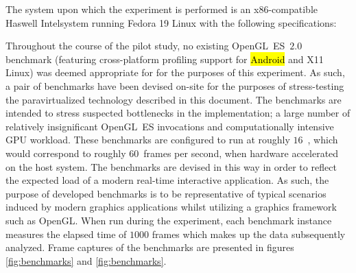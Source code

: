 The system upon which the experiment is performed is an x86-compatible Haswell Intel\circledR system running Fedora 19 Linux with the following specifications:


Throughout the course of the pilot study, no existing OpenGL~ES~$2.0$ benchmark (featuring cross-platform profiling support for \hl{Android} and X11 Linux) was deemed appropriate for for the purposes of this experiment.
As such, a pair of benchmarks have been devised on-site for the purposes of stress-testing the paravirtualized technology described in this document.
The benchmarks are intended to stress suspected bottlenecks in the implementation; a large number of relatively insignificant OpenGL~ES invocations and computationally intensive GPU workload.
These benchmarks are configured to run at roughly $16$~\milli\second , which would correspond to roughly $60$~frames per second, when hardware accelerated on the host system.
The benchmarks are devised in this way in order to reflect the expected load of a modern real-time interactive application.
As such, the purpose of developed benchmarks is to be representative of typical scenarios induced by modern graphics applications whilst utilizing a graphics framework such as OpenGL.
When run during the experiment, each benchmark instance measures the elapsed time of $1000$ frames which makes up the data subsequently analyzed.
Frame captures of the benchmarks are presented in figures \ref{fig:benchmarks} and \ref{fig:benchmarks}.

